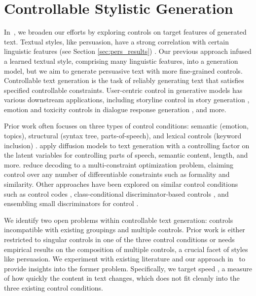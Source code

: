 \section{Controllable Stylistic Generation}
\label{sec:intro_control}

In~, we broaden our efforts by exploring controls on target features of generated text. Textual styles, like persuasion, have a strong correlation with certain linguistic features (see Section \ref{sec:pers_results}) \citep{gamon2004linguistic}. Our previous approach infused a learned textual style, comprising many linguistic features, into a generation model, but we aim to generate persuasive text with more fine-grained controls. Controllable text generation is the task of reliably generating text that satisfies specified controllable constraints. User-centric control in generative models has various downstream applications, including storyline control in story generation \citep{peng2018towards}, emotion and toxicity controls in dialogue response generation \citep{lu2022quark, zhou2018emotional}, and more. 

Prior work often focuses on three types of control conditions: semantic (\eg emotion, topics), structural (\eg syntax tree, parts-of-speech), and lexical controls (\eg keyword inclusion) \citep{Zhang2022ASO}. \citet{li2022diffusion} apply diffusion models to text generation with a controlling factor on the latent variables for controlling parts of speech, semantic content, length, and more. \citet{kumar2021controlled} reduce decoding to a multi-constraint optimization problem, claiming control over any number of differentiable constraints such as formality and similarity. Other approaches have been explored on similar control conditions such as control codes \citep{keskar2019ctrl}, class-conditional discriminator-based controls \citep{yang2021fudge}, and ensembling small discriminators for control \citep{krause2020gedi}. 


We identify two open problems within controllable text generation: controls incompatible with existing groupings and multiple controls. Prior work is either restricted to singular controls in one of the three control conditions or needs empirical results on the composition of multiple controls, a crucial facet of styles like persuasion. We experiment with existing literature and our approach in~ to provide insights into the former problem. Specifically, we target speed \citep{toubia-2021}, a measure of how quickly the content in text changes, which does not fit cleanly into the three existing control conditions. 


